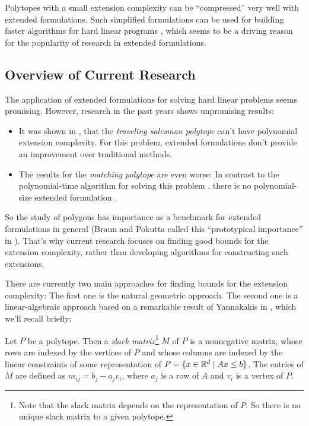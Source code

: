 Polytopes with a small extension complexity can be ``compressed'' very well with extended formulations.
Such simplified formulations can be used for building faster algorithms for hard linear programs \cite{yannakakis1991expressing}, which seems to be a driving reason for the popularity of research in extended formulations.


\subsection{Overview of Current Research}

The application of extended formulations for solving hard linear problems seems promising. However, research in the past years shows unpromising results:

\begin{itemize}
  \item It was shown in \cite{fiorini2015exponential}, that the \emph{traveling salesman polytope} can't have polynomial extension complexity. For this problem, extended formulations don't provide an improvement over traditional methods.
  \item The results for the \emph{matching polytope} are even worse: In contrast to the polynomial-time algorithm for solving this problem \cite{ford1956maximal}, there is no polynomial-size extended formulation \cite{rothvoss2017matching}.
\end{itemize}

So the study of polygons has importance as a benchmark for extended formulations in general (Braun and Pokutta called this ``prototypical importance'' in \cite{braun2015matching}).
That's why current research focuses on finding good bounds for the extension complexity, rather than developing algorithms for constructing such extensions.

There are currently two main approaches for finding bounds for the extension complexity: The first one is the natural geometric approach. The second one is a linear-algebraic approach based on a remarkable result of Yannakakis in \cite{yannakakis1991expressing}, which we'll recall briefly:

\begin{definition}
  Let $P$ be a polytope.
  Then a \emph{slack matrix}\footnote{Note that the slack matrix depends on the representation of $P$. So there is no unique slack matrix to a given polytope.} $M$ of $P$ is a nonnegative matrix, whose rows are indexed by the vertices of $P$ and whose columns are indexed by the linear constraints of some representation of $P=\{x \in \mathbb{R}^d \mid Ax \leq b\}$. 
  The entries of $M$ are defined as $m_{ij} = b_j - a_j v_i$, where $a_j$ is a row of $A$ and $v_i$ is a vertex of $P$.
\end{definition}

